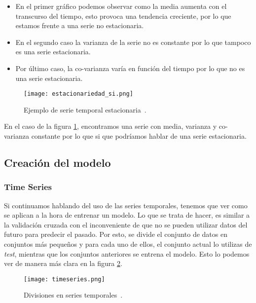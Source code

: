 \begin{itemize}
	\item En el primer gráfico podemos observar como la media aumenta con el transcurso del tiempo, esto provoca una tendencia creciente, por lo que estamos frente a una serie no estacionaria.
	\item En el segundo caso la varianza de la serie no es constante por lo que tampoco es una serie estacionaria.
	\item Por último caso, la co-varianza varía en función del tiempo por lo que no es una serie estacionaria. 
\end{itemize}

\begin{figure}%
	\centering
	\texttt{[image: estacionariedad\_si.png]}
	\caption[Ejemplo de serie temporal estacionaria]{Ejemplo de serie temporal estacionaria~\cite{SeriesTempIMG}.}\label{serie_si_estacionaria}
\end{figure}

En el caso de la figura \ref{serie_si_estacionaria}, encontramos una serie con media, varianza y co-varianza constante por lo que si que podríamos hablar de una serie estacionaria. 

\subsection{Creación del modelo}

\subsubsection{Time Series}
Si continuamos hablando del uso de las series temporales, tenemos que ver como se aplican a la hora de entrenar un modelo. Lo que se trata de hacer, es similar a la validación cruzada con el inconveniente de que no se pueden utilizar datos del futuro para predecir el pasado. Por esto, se divide el conjunto de datos en conjuntos más pequeños y para cada uno de ellos, el conjunto actual lo utilizas de \emph{test}, mientras que los conjuntos anteriores se entrena el modelo. Esto lo podemos ver de manera más clara en la figura \ref{timeseriesimage}.

\begin{figure}%
	\centering
	\texttt{[image: timeseries.png]}
	\caption[Divisiones en series temporales]{Divisiones en series temporales~\cite{timeseriesimage}.}\label{timeseriesimage}
\end{figure}

